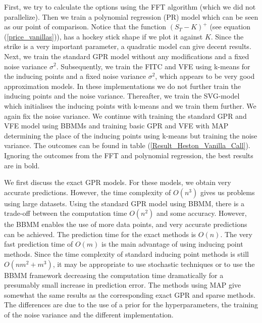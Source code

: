 \documentclass[12pt,a4paper,oneside]{book}
\begin{document}
First, we try to calculate the options using the FFT algorithm (which we did not parallelize). Then we train a polynomial regression (PR) model which can be seen as our point of comparison. Notice that the function $(S_T - K)^{+}$ (see equation (\ref{price_vanillas})), has a hockey stick shape if we plot it against $K$. Since the strike is a very important parameter, a quadratic model can give decent results. Next, we train the standard GPR model without any modifications and a fixed noise variance $\sigma^2$. Subsequently, we train the FITC and VFE using k-means for the inducing points and a fixed noise variance $\sigma^2$, which appears to be very good approximation models. In these implementations we do not further train the inducing points and the noise variance. Thereafter, we train the SVG-model which initialises the inducing points with k-means and we train them further. We again fix the noise variance. We continue with training the standard GPR and VFE model using BBMMs and training basic GPR and VFE with MAP determining the place of the inducing points using k-means but training the noise variance. The outcomes can be found in table (\ref{Result_Heston_Vanilla_Call}). Ignoring the outcomes from the FFT and polynomial regression, the best results are in bold. 

We first discuss the exact GPR models. For these models, we obtain very accurate predictions. However, the time complexity of $O(n^3)$ gives us problems using large datasets. Using the standard GPR model using BBMM, there is a trade-off between the computation time $O(n^2)$ and some accuracy. However, the BBMM enables the use of more data points, and very accurate predictions can be achieved. The prediction time for the exact methods is $O(n)$. The very fast prediction time of $O(m)$ is the main advantage of using inducing point methods. Since the time complexity of standard inducing point methods is still $O(nm^2 +m^3)$, it may be appropriate to use stochastic techniques or to use the BBMM framework decreasing the computation time dramatically for a presumably small increase in prediction error. The methods using MAP give somewhat the same results as the corresponding exact GPR and sparse methods. The differences are due to the use of a prior for the hyperparameters, the training of the noise variance and the different implementation. 
\end{document}
